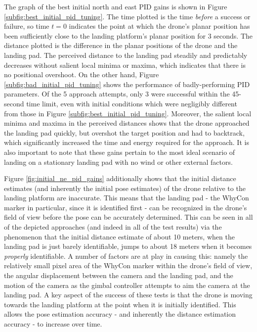 The graph of the best initial north and east PID gains is shown in Figure \ref{subfig:best_initial_pid_tuning}. The time plotted is the time \textit{before} a success or failure, so time $t=0$ indicates the point at which the drone's planar position has been sufficiently close to the landing platform's planar position for 3 seconds. The distance plotted is the difference in the planar positions of the drone and the landing pad. The perceived distance to the landing pad steadily and predictably decreases without salient local minima or maxima, which indicates that there is no positional overshoot. On the other hand, Figure \ref{subfig:bad_initial_pid_tuning} shows the performance of badly-performing PID parameters. Of the 5 approach attempts, only 3 were successful within the 45-second time limit, even with initial conditions which were negligibly different from those in Figure \ref{subfig:best_initial_pid_tuning}. Moreover, the salient local minima and maxima in the perceived distances shows that the drone approached the landing pad quickly, but overshot the target position and had to backtrack, which significantly increased the time and energy required for the approach. It is also important to note that these gains pertain to the most ideal scenario of landing on a stationary landing pad with no wind or other external factors.

Figure \ref{fig:initial_ne_pid_gains} additionally shows that the initial distance estimates (and inherently the initial pose estimates) of the drone relative to the landing platform are inaccurate. This means that the landing pad - the WhyCon marker in particular, since it is identified first - can be recognized in the drone's field of view before the pose can be accurately determined. This can be seen in all of the depicted approaches (and indeed in all of the test results) via the phenomenon that the initial distance estimate of about 10 meters, when the landing pad is just barely identifiable, jumps to about 18 meters when it becomes \textit{properly} identifiable. A number of factors are at play in causing this: namely the relatively small pixel area of the WhyCon marker within the drone's field of view, the angular displacement between the camera and the landing pad, and the motion of the camera as the gimbal controller attempts to aim the camera at the landing pad. A key aspect of the success of these tests is that the drone is moving towards the landing platform at the point when it is initially identified. This allows the pose estimation accuracy - and inherently the distance estimation accuracy - to increase over time.

